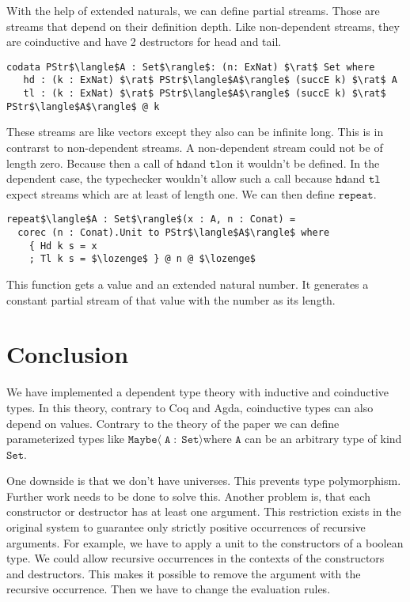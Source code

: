 \documentclass[a4paper,cleardoubleempty,BCOR1cm]{scrbook}
\begin{document}
With the help of extended naturals, we can define partial streams. Those are
streams that depend on their definition depth. Like non-dependent streams,
they are coinductive and have 2 destructors for head and tail.
\begin{lstlisting}
codata PStr$\langle$A : Set$\rangle$: (n: ExNat) $\rat$ Set where
   hd : (k : ExNat) $\rat$ PStr$\langle$A$\rangle$ (succE k) $\rat$ A
   tl : (k : ExNat) $\rat$ PStr$\langle$A$\rangle$ (succE k) $\rat$ PStr$\langle$A$\rangle$ @ k
\end{lstlisting}
These streams are like vectors except they also can be infinite long. This is
in contrarst to non-dependent streams.  A non-dependent stream could not be of
length zero.  Because then a call of $\mathtt{hd}$\;and $\mathtt{tl}$\;on it wouldn't be defined.  In the
dependent case, the typechecker wouldn't allow such a call because $\mathtt{hd}$\;and
$\mathtt{tl}$\;expect streams which are at least of length one.  We can then define
$\mathtt{repeat}$.
\begin{lstlisting}
repeat$\langle$A : Set$\rangle$(x : A, n : Conat) =
  corec (n : Conat).Unit to PStr$\langle$A$\rangle$ where
    { Hd k s = x
    ; Tl k s = $\lozenge$ } @ n @ $\lozenge$
\end{lstlisting}
This function gets a value and an extended natural number. It generates a
constant partial stream of that value with the number as its length.


\chapter{Conclusion}
\label{sec:org82b5582}
We have implemented a dependent type theory with inductive and coinductive
types. In this theory, contrary to Coq and Agda, coinductive types can also
depend on values. Contrary to the theory of the paper we can define
parameterized types like $\mathtt{Maybe\langle\;A\;:\;Set\rangle}$\;where $\mathtt{A}$
can be an arbitrary type of kind $\mathtt{Set}$.

One downside is that we don't have universes. This prevents type polymorphism.
Further work needs to be done to solve this. Another problem is, that each
constructor or destructor has at least one argument. This restriction exists
in the original system to guarantee only strictly positive occurrences of
recursive arguments. For example, we have to apply a unit to the constructors
of a boolean type. We could allow recursive occurrences in the contexts of the
constructors and destructors. This makes it possible to remove the argument
with the recursive occurrence. Then we have to change the evaluation rules.
\end{document}
